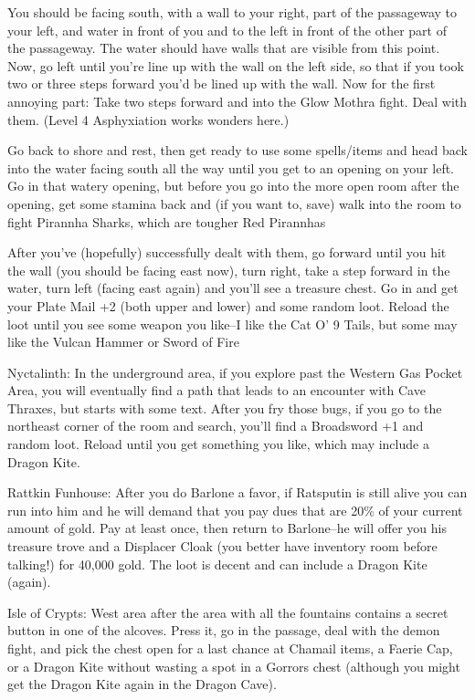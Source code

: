 \documentclass[12pt]{article}
\begin{document}
         You should be facing south, with a wall to your right, part of the
         passageway to your left, and water in front of you and to the left
         in front of the other part of the passageway.  The water should
         have walls that are visible from this point.  Now, go left until
         you're line up with the wall on the left side, so that if you took
         two or three steps forward you'd be lined up with the wall.  Now
         for the first annoying part:  Take two steps forward and into
         the Glow Mothra fight.  Deal with them.  (Level 4 Asphyxiation
         works wonders here.)

         Go back to shore and rest, then get ready to use some spells/items
         and head back into the water facing south all the way until you get
         to an opening on your left.  Go in that watery opening, but before
         you go into the more open room after the opening, get some stamina
         back and (if you want to, save) walk into the room to fight
         Pirannha Sharks, which are tougher Red Pirannhas

         After you've (hopefully) successfully dealt with them, go forward
         until you hit the wall (you should be facing east now), turn right,
         take a step forward in the water, turn left (facing east again)
         and you'll see a treasure chest.  Go in and get your Plate Mail +2
         (both upper and lower) and some random loot.  Reload the loot until
         you see some weapon you like--I like the Cat O' 9 Tails, but some
         may like the Vulcan Hammer or Sword of Fire

Nyctalinth: In the underground area, if you explore past the Western Gas
Pocket Area, you will eventually find a path that leads to an encounter
with Cave Thraxes, but starts with some text. After you fry those bugs,
if you go to the northeast corner of the room and search, you'll find a
Broadsword +1 and random loot. Reload until you get something you like,
which may include a Dragon Kite.

Rattkin Funhouse: After you do Barlone a favor, if Ratsputin is still
alive you can run into him and he will demand that you pay dues that are
20\% of your current amount of gold. Pay at least once, then return to
Barlone--he will offer you his treasure trove and a Displacer Cloak (you
better have inventory room before talking!) for 40,000 gold. The loot is
decent and can include a Dragon Kite (again).

Isle of Crypts: West area after the area with all the fountains contains
a secret button in one of the alcoves. Press it, go in the passage, deal
with the demon fight, and pick the chest open for a last chance at
Chamail items, a Faerie Cap, or a Dragon Kite without wasting a spot in
a Gorrors chest (although you might get the Dragon Kite again in the
Dragon Cave).
\end{document}

